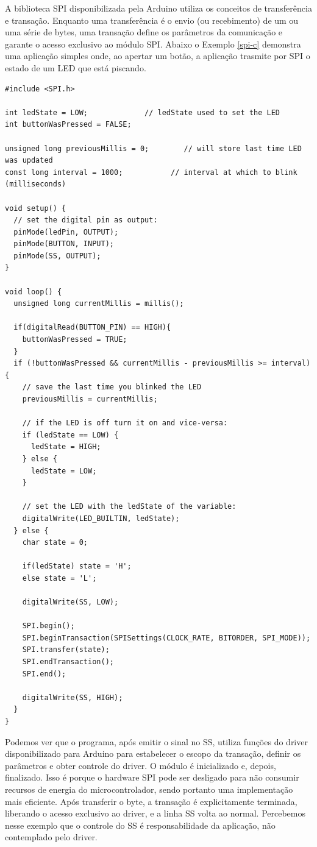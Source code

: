 \documentclass[11pt]{article}
\begin{document}
\par A biblioteca SPI disponibilizada pela Arduino utiliza os conceitos de transferência e transação. Enquanto uma transferência é o envio (ou recebimento) de um ou uma série de bytes, uma transação define os parâmetros da comunicação e garante o acesso exclusivo ao módulo SPI. Abaixo o Exemplo \ref{spi-c} demonstra uma aplicação simples onde, ao apertar um botão, a aplicação trasmite por SPI o estado de um LED que está piscando.
\begin{lstlisting}[style=CStyle,label=spi-c,caption=Aplicação em C utilizando driver SPI bloqueante]
#include <SPI.h>

int ledState = LOW;             // ledState used to set the LED
int buttonWasPressed = FALSE;

unsigned long previousMillis = 0;        // will store last time LED was updated
const long interval = 1000;           // interval at which to blink (milliseconds)

void setup() {
  // set the digital pin as output:
  pinMode(ledPin, OUTPUT);
  pinMode(BUTTON, INPUT);
  pinMode(SS, OUTPUT);
}

void loop() {
  unsigned long currentMillis = millis();

  if(digitalRead(BUTTON_PIN) == HIGH){
    buttonWasPressed = TRUE;
  }
  if (!buttonWasPressed && currentMillis - previousMillis >= interval) {
    // save the last time you blinked the LED
    previousMillis = currentMillis;

    // if the LED is off turn it on and vice-versa:
    if (ledState == LOW) {
      ledState = HIGH;
    } else {
      ledState = LOW;
    }

    // set the LED with the ledState of the variable:
    digitalWrite(LED_BUILTIN, ledState);
  } else {
    char state = 0;

    if(ledState) state = 'H';
    else state = 'L';

    digitalWrite(SS, LOW);

    SPI.begin();
    SPI.beginTransaction(SPISettings(CLOCK_RATE, BITORDER, SPI_MODE));
    SPI.transfer(state);
    SPI.endTransaction();
    SPI.end();

    digitalWrite(SS, HIGH);
  }
}
\end{lstlisting}
\par Podemos ver que o programa, após emitir o sinal no SS, utiliza funções do driver disponibilizado para Arduino para estabelecer o escopo da transação, definir os parâmetros e obter controle do driver. O módulo é inicializado e, depois, finalizado. Isso é porque o hardware SPI pode ser desligado para não consumir recursos de energia do microcontrolador, sendo portanto uma implementação mais eficiente. Após transferir o byte, a transação é explicitamente terminada, liberando o acesso exclusivo ao driver, e a linha SS volta ao normal. Percebemos nesse exemplo que o controle do SS é responsabilidade da aplicação, não contemplado pelo driver.
\end{document}
